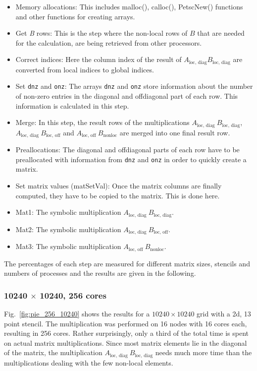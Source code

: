 \begin{itemize}
\item Memory allocations: This includes malloc(), calloc(), PetscNew() functions and other functions for creating arrays.
\item Get \textit{B} rows: This is the step where the non-local rows of $B$ that are needed for the calculation, are being retrieved from other processors.
\item Correct indices: Here the column index of the result of $A_{\textrm{loc, diag}} B_{\textrm{loc, diag}}$ are converted from local indices to global indices.
\item Set \texttt{dnz} and \texttt{onz}: The arrays \texttt{dnz} and \texttt{onz} store information about the number of non-zero entries in the diagonal and offdiagonal part of each row. This information is calculated in this step. 
\item Merge: In this step, the result rows of the multiplications $A_{\textrm{loc, diag~}} B_{\textrm{loc, diag}}$,   \\$A_{\textrm{loc, diag~}} B_{\textrm{loc, off}}$ and $A_{\textrm{loc, off~}} B_{\textrm{nonloc}}$ are merged into one final result row.
\item Preallocations: The diagonal and offdiagonal parts of each row have to be preallocated with information from \texttt{dnz} and \texttt{onz} in order to quickly create a matrix.
\item Set matrix values (matSetVal): Once the matrix columns are finally computed, they have to be copied to the matrix. This is done here.
\item Mat1: The symbolic multiplication $A_{\textrm{loc, diag~}} B_{\textrm{loc, diag}}$.
\item Mat2: The symbolic multiplication $A_{\textrm{loc, diag~}} B_{\textrm{loc, off}}$.
\item Mat3: The symbolic multiplication $A_{\textrm{loc, off~}} B_{\textrm{nonloc}}$.
\end{itemize}

The percentages of each step are measured for different matrix sizes, stencils and numbers of processes and the results are given in the following.

\subsubsection*{10240 $\times$ 10240, 256 cores}
Fig.~\ref{fig:pie_256_10240} shows the results for a $10240 \times 10240$ grid with a 2d, 13 point stencil. The multiplication was performed on 16 nodes with 16 cores each, resulting in 256 cores. Rather surprisingly, only a third of the total time is spent on actual matrix multiplications. Since most matrix elements lie in the diagonal of the matrix, the multiplication $A_{\textrm{loc, diag}}~B_{\textrm{loc, diag}}$ needs much more time than the multiplications dealing with the few non-local elements. 

